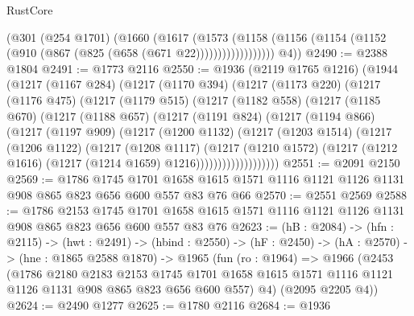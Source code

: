 \begin{lexlean}{RustCore}
\begin{coremodule}
                  (@301
                    (@254 @1701)
                    (@1660
                      (@1617
                        (@1573
                          (@1158
                            (@1156 (@1154 (@1152 (@910 (@867 (@825 (@658 (@671 @22))))))))))))))))))
        @4))
@2490 := @2388 @1804
@2491 := @1773 @2116
@2550 := @1936
    (@2119 @1765 @1216)
    (@1944
      (@1217
        (@1167 @284)
        (@1217
          (@1170 @394)
          (@1217
            (@1173 @220)
            (@1217
              (@1176 @475)
              (@1217
                (@1179 @515)
                (@1217
                  (@1182 @558)
                  (@1217
                    (@1185 @670)
                    (@1217
                      (@1188 @657)
                      (@1217
                        (@1191 @824)
                        (@1217
                          (@1194 @866)
                          (@1217
                            (@1197 @909)
                            (@1217
                              (@1200 @1132)
                              (@1217
                                (@1203 @1514)
                                (@1217
                                  (@1206 @1122)
                                  (@1217
                                    (@1208 @1117)
                                    (@1217
                                      (@1210 @1572)
                                      (@1217
                                        (@1212 @1616)
                                        (@1217 (@1214 @1659) @1216)))))))))))))))))))
@2551 := @2091 @2150
@2569 := @1786
    @1745
    @1701
    @1658
    @1615
    @1571
    @1116
    @1121
    @1126
    @1131
    @908
    @865
    @823
    @656
    @600
    @557
    @83
    @76
    @66
@2570 := @2551 @2569
@2588 := @1786
    @2153
    @1745
    @1701
    @1658
    @1615
    @1571
    @1116
    @1121
    @1126
    @1131
    @908
    @865
    @823
    @656
    @600
    @557
    @83
    @76
@2623 := (hB : @2084) ->
  (hfn : @2115) ->
  (hwt : @2491) ->
  (hbind : @2550) ->
  (hF : @2450) ->
  (hA : @2570) ->
  (hne : @1865 @2588 @1870) ->
  @1965
    (fun (ro : @1964) =>
    @1966
      (@2453
        (@1786
          @2180
          @2183
          @2153
          @1745
          @1701
          @1658
          @1615
          @1571
          @1116
          @1121
          @1126
          @1131
          @908
          @865
          @823
          @656
          @600
          @557)
        @4)
      (@2095 @2205 @4))
@2624 := @2490 @1277
@2625 := @1780 @2116
@2684 := @1936

\end{coremodule}
\end{lexlean}
